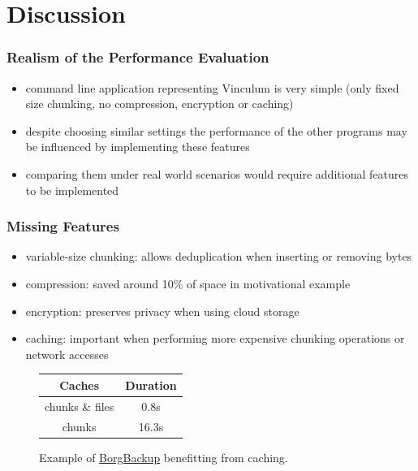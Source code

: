 \documentclass[english,utf8,aspectratio=169]{beamer}
\begin{document}
    \section{Discussion}
    \begin{frame}
        \frametitle{Realism of the Performance Evaluation}
        \begin{itemize}
            \item command line application representing Vinculum is very simple
                (only fixed size chunking, no compression, encryption or caching)
            \item despite choosing similar settings the performance of the other
                programs may be influenced by implementing these features
            \item comparing them under real world scenarios would require additional
                features to be implemented
        \end{itemize}
    \end{frame}

    \begin{frame}
        \frametitle{Missing Features}
        \begin{itemize}
            \item variable-size chunking: allows deduplication when inserting or removing bytes
            \item compression: saved around 10\% of space in motivational example
            \item encryption: preserves privacy when using cloud storage
            \item caching: important when performing more expensive chunking operations
                or network accesses
        \end{itemize}

        \begin{figure}
            \begin{tabular}{ c c }
                \toprule
                Caches & Duration \\
                \midrule
                chunks \& files & 0.8s \\
                \midrule
                chunks & 16.3s \\
                \bottomrule
            \end{tabular}
            \caption{\small{Example of \href{https://www.borgbackup.org}{BorgBackup} benefitting from caching.}}
        \end{figure}
    \end{frame}
\end{document}
